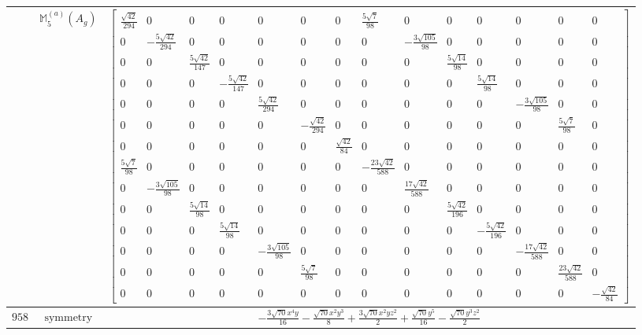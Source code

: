 \documentclass[fleqn,8pt,landscape]{jsarticle}
\begin{document}
\begin{longtable}{ccc}
$  $ & $ \mathbb{M}_{5}^{(a)}(A_{g}) $ & $ \begin{bmatrix} \frac{\sqrt{42}}{294} & 0 & 0 & 0 & 0 & 0 & 0 & \frac{5 \sqrt{7}}{98} & 0 & 0 & 0 & 0 & 0 & 0 \\ 0 & - \frac{5 \sqrt{42}}{294} & 0 & 0 & 0 & 0 & 0 & 0 & - \frac{3 \sqrt{105}}{98} & 0 & 0 & 0 & 0 & 0 \\ 0 & 0 & \frac{5 \sqrt{42}}{147} & 0 & 0 & 0 & 0 & 0 & 0 & \frac{5 \sqrt{14}}{98} & 0 & 0 & 0 & 0 \\ 0 & 0 & 0 & - \frac{5 \sqrt{42}}{147} & 0 & 0 & 0 & 0 & 0 & 0 & \frac{5 \sqrt{14}}{98} & 0 & 0 & 0 \\ 0 & 0 & 0 & 0 & \frac{5 \sqrt{42}}{294} & 0 & 0 & 0 & 0 & 0 & 0 & - \frac{3 \sqrt{105}}{98} & 0 & 0 \\ 0 & 0 & 0 & 0 & 0 & - \frac{\sqrt{42}}{294} & 0 & 0 & 0 & 0 & 0 & 0 & \frac{5 \sqrt{7}}{98} & 0 \\ 0 & 0 & 0 & 0 & 0 & 0 & \frac{\sqrt{42}}{84} & 0 & 0 & 0 & 0 & 0 & 0 & 0 \\ \frac{5 \sqrt{7}}{98} & 0 & 0 & 0 & 0 & 0 & 0 & - \frac{23 \sqrt{42}}{588} & 0 & 0 & 0 & 0 & 0 & 0 \\ 0 & - \frac{3 \sqrt{105}}{98} & 0 & 0 & 0 & 0 & 0 & 0 & \frac{17 \sqrt{42}}{588} & 0 & 0 & 0 & 0 & 0 \\ 0 & 0 & \frac{5 \sqrt{14}}{98} & 0 & 0 & 0 & 0 & 0 & 0 & \frac{5 \sqrt{42}}{196} & 0 & 0 & 0 & 0 \\ 0 & 0 & 0 & \frac{5 \sqrt{14}}{98} & 0 & 0 & 0 & 0 & 0 & 0 & - \frac{5 \sqrt{42}}{196} & 0 & 0 & 0 \\ 0 & 0 & 0 & 0 & - \frac{3 \sqrt{105}}{98} & 0 & 0 & 0 & 0 & 0 & 0 & - \frac{17 \sqrt{42}}{588} & 0 & 0 \\ 0 & 0 & 0 & 0 & 0 & \frac{5 \sqrt{7}}{98} & 0 & 0 & 0 & 0 & 0 & 0 & \frac{23 \sqrt{42}}{588} & 0 \\ 0 & 0 & 0 & 0 & 0 & 0 & 0 & 0 & 0 & 0 & 0 & 0 & 0 & - \frac{\sqrt{42}}{84} \end{bmatrix} $ \\ \hline
$ 958 $ & $ \text{symmetry} $ & $ - \frac{3 \sqrt{70} x^{4} y}{16} - \frac{\sqrt{70} x^{2} y^{3}}{8} + \frac{3 \sqrt{70} x^{2} y z^{2}}{2} + \frac{\sqrt{70} y^{5}}{16} - \frac{\sqrt{70} y^{3} z^{2}}{2} $ \\

\end{longtable}
\end{document}
